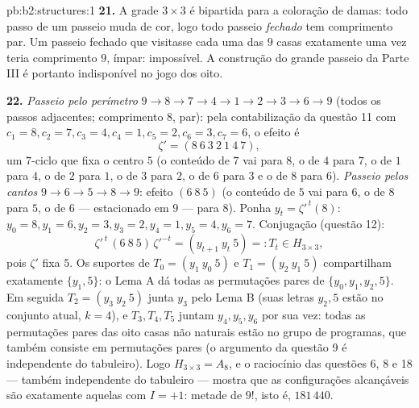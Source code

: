 \begin{solution}{pb:b2:structures:1}
\textbf{21.} A grade $3 \times 3$ é bipartida para a
coloração de damas: todo passo de um passeio muda de cor, logo
todo passeio \emph{fechado} tem comprimento par. Um passeio fechado que visitasse
cada uma das $9$ casas exatamente uma vez teria comprimento $9$, ímpar:
impossível. A construção do grande passeio da Parte III é portanto
indisponível no jogo dos oito.

\textbf{22.} \emph{Passeio pelo perímetro} $9 \to 8 \to 7 \to 4 \to 1
\to 2 \to 3 \to 6 \to 9$ (todos os passos adjacentes; comprimento $8$, par):
pela contabilização da questão 11 com $c_1 = 8, c_2 = 7, c_3 =
4, c_4 = 1, c_5 = 2, c_6 = 3, c_7 = 6$, o efeito é
\[
\zeta' = (8\ 6\ 3\ 2\ 1\ 4\ 7),
\]
um $7$-ciclo que fixa o centro $5$ (o conteúdo de $7$ vai para $8$,
o de $4$ para $7$, o de $1$ para $4$, o de $2$ para $1$, o de $3$ para $2$, o de
$6$ para $3$ e o de $8$ para $6$). \emph{Passeio pelos cantos} $9 \to 6 \to
5 \to 8 \to 9$: efeito $(6\ 8\ 5)$ (o conteúdo de $5$ vai para
$6$, o de $8$ para $5$, o de $6$ --- estacionado em $9$ --- para $8$). Ponha
$y_t = \zeta'^{\,t}(8)$: $y_0 = 8, y_1 = 6, y_2 = 3, y_3 = 2,
y_4 = 1, y_5 = 4, y_6 = 7$. Conjugação (questão 12):
\[
\zeta'^{\,t}\,(6\ 8\ 5)\,\zeta'^{-t}
= (y_{t+1}\ y_t\ 5) =: T_t \in H_{3\times3},
\]
pois $\zeta'$ fixa $5$. Os suportes de $T_0 = (y_1\ y_0\ 5)$
e $T_1 = (y_2\ y_1\ 5)$ compartilham exatamente $\{y_1, 5\}$: o Lema A
dá todas as permutações pares de $\{y_0, y_1, y_2, 5\}$. Em seguida
$T_2 = (y_3\ y_2\ 5)$ junta $y_3$ pelo Lema B (suas letras
$y_2, 5$ estão no conjunto atual, $k = 4$), e $T_3, T_4, T_5$
juntam $y_4, y_5, y_6$ por sua vez: todas as permutações pares das
oito casas não naturais estão no grupo de programas, que também
consiste em permutações pares (o argumento da questão 9 é
independente do tabuleiro). Logo $H_{3\times3} = A_8$, e o raciocínio
das questões 6, 8 e 18 --- também independente do tabuleiro --- mostra que as
configurações alcançáveis são exatamente aquelas com $I = +1$: metade
de $9!$, isto é, $181\,440$.


\end{solution}
